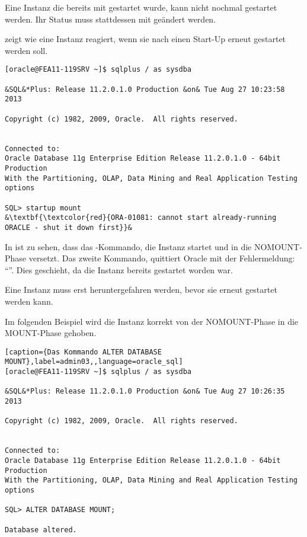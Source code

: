         \begin{merke}
          Eine Instanz die bereits mit  gestartet wurde, kann nicht nochmal gestartet werden. Ihr Status muss stattdessen mit  geändert werden.
        \end{merke}
         zeigt wie eine Instanz reagiert, wenn sie nach einen Start-Up erneut gestartet werden soll.
\clearpage
        \begin{lstlisting}[caption={ORACLE läuft noch. Erst
        stoppen.},label=admin02,language=sqlplus]
[oracle@FEA11-119SRV ~]$ sqlplus / as sysdba

&SQL&*Plus: Release 11.2.0.1.0 Production &on& Tue Aug 27 10:23:58 2013

Copyright (c) 1982, 2009, Oracle.  All rights reserved.


Connected to:
Oracle Database 11g Enterprise Edition Release 11.2.0.1.0 - 64bit Production
With the Partitioning, OLAP, Data Mining and Real Application Testing options

SQL> startup mount
&\textbf{\textcolor{red}{ORA-01081: cannot start already-running ORACLE - shut it down first}}&
        \end{lstlisting}
        In  ist zu sehen, dass das -Kommando, die Instanz startet und in die NOMOUNT-Phase versetzt. Das zweite Kommando,  quittiert Oracle mit der Fehlermeldung: \enquote{}. Dies geschieht, da die Instanz bereits gestartet worden war.

        \begin{merke}
          Eine Instanz muss erst heruntergefahren werden, bevor sie erneut gestartet werden kann.
        \end{merke}
        Im folgenden Beispiel wird die Instanz korrekt von der NOMOUNT-Phase in die MOUNT-Phase gehoben.
        \begin{lstlisting}[caption={Das Kommando ALTER DATABASE MOUNT},label=admin03,,language=oracle_sql]
[oracle@FEA11-119SRV ~]$ sqlplus / as sysdba

&SQL&*Plus: Release 11.2.0.1.0 Production &on& Tue Aug 27 10:26:35 2013

Copyright (c) 1982, 2009, Oracle.  All rights reserved.


Connected to:
Oracle Database 11g Enterprise Edition Release 11.2.0.1.0 - 64bit Production
With the Partitioning, OLAP, Data Mining and Real Application Testing options

SQL> ALTER DATABASE MOUNT;

Database altered.
        \end{lstlisting}
